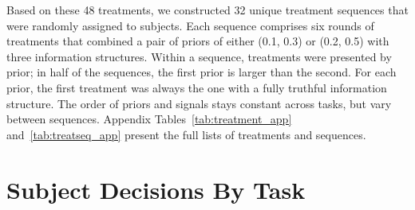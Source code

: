 \documentclass[12pt,a4paper]{article}
\newcommand{\agt}[1]{{\color{OliveGreen}#1}}
\newcommand{\pmt}[1]{{\color{Blue}#1}}
\begin{document}
Based on these 48 treatments, we constructed 32 unique treatment sequences that were randomly assigned to subjects. Each sequence comprises six rounds of treatments that combined a pair of priors of either (0.1, 0.3) or (0.2, 0.5) with three information structures. Within a sequence, treatments were presented by prior; in half of the sequences, the first prior is larger than the second. For each prior, the first treatment was always the one with a fully truthful information structure. The order of priors and signals stays constant across tasks, but vary between sequences. Appendix Tables~\ref{tab:treatment_app} and~\ref{tab:treatseq_app}  present the full lists of treatments and sequences.

\begin{table}[h!]
\centering
\caption{List of Treatments} \label{tab:treatments}

\end{table}


 
\section{Subject Decisions By Task}\label{sec:sanity}
\end{document}
